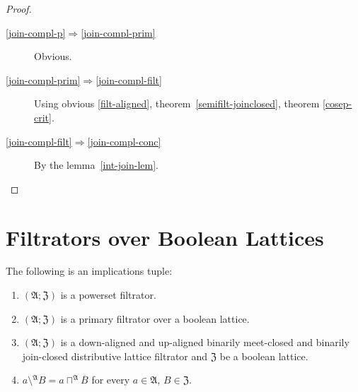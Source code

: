 \begin{proof}
~
\begin{description}
\item [{\ref{join-compl-p}$\Rightarrow$\ref{join-compl-prim}}] Obvious.
\item [{\ref{join-compl-prim}$\Rightarrow$\ref{join-compl-filt}}] Using
obvious \ref{filt-aligned}, theorem~\ref{semifilt-joinclosed},
theorem \ref{cosep-crit}.
\item [{\ref{join-compl-filt}$\Rightarrow$\ref{join-compl-conc}}] By
the lemma~\ref{int-join-lem}.
\end{description}
\end{proof}

\section{Filtrators over Boolean Lattices}
\begin{prop}
\label{b-bool-minus}The following is an implications tuple:
\begin{enumerate}
\item \label{bool-minus-p}$(\mathfrak{A};\mathfrak{Z})$ is a powerset
filtrator.
\item \label{bool-minus-f}$(\mathfrak{A};\mathfrak{Z})$ is a primary filtrator
over a boolean lattice.
\item \label{bool-minus-fltr}$(\mathfrak{A};\mathfrak{Z})$ is a down-aligned
and up-aligned binarily meet-closed and binarily join-closed distributive
lattice filtrator and $\mathfrak{Z}$ be a boolean lattice.
\item \label{bool-minus-conc}$a\setminus{}^{\mathfrak{A}}B=a\sqcap^{\mathfrak{A}}\overline{B}$
for every $a\in\mathfrak{A}$, $B\in\mathfrak{Z}$.
\end{enumerate}
\end{prop}
